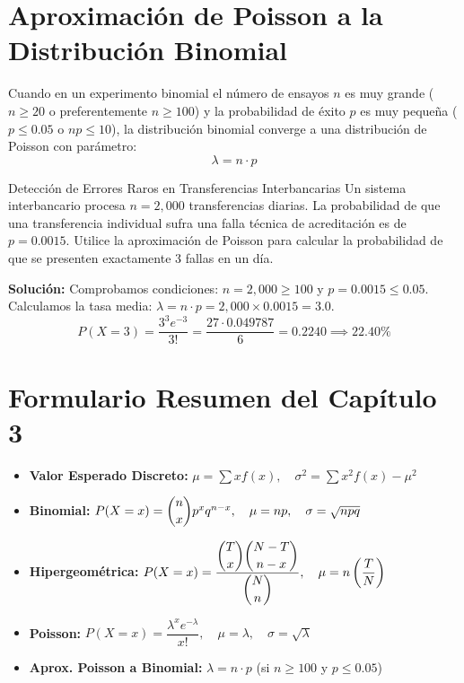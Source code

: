 \section{Aproximación de Poisson a la Distribución Binomial}
Cuando en un experimento binomial el número de ensayos $n$ es muy grande ($n \ge 20$ o preferentemente $n \ge 100$) y la probabilidad de éxito $p$ es muy pequeña ($p \le 0.05$ o $np \le 10$), la distribución binomial converge a una distribución de Poisson con parámetro:
\begin{equation}
    \lambda = n \cdot p
\end{equation}

\begin{ejemplo}{Detección de Errores Raros en Transferencias Interbancarias}
Un sistema interbancario procesa $n = 2{,}000$ transferencias diarias. La probabilidad de que una transferencia individual sufra una falla técnica de acreditación es de $p = 0.0015$. Utilice la aproximación de Poisson para calcular la probabilidad de que se presenten exactamente 3 fallas en un día.

\tcbline
\textbf{Solución:}
Comprobamos condiciones: $n = 2{,}000 \ge 100$ y $p = 0.0015 \le 0.05$.
Calculamos la tasa media: $\lambda = n \cdot p = 2{,}000 \times 0.0015 = 3.0$.
\[
P(X = 3) = \frac{3^3 e^{-3}}{3!} = \frac{27 \cdot 0.049787}{6} = 0.2240 \implies 22.40\%
\]
\end{ejemplo}

\section{Formulario Resumen del Capítulo 3}
\begin{formulario}
\begin{itemize}
    \item \textbf{Valor Esperado Discreto:} $\mu = \sum x f(x), \quad \sigma^2 = \sum x^2 f(x) - \mu^2$
    \item \textbf{Binomial:} $P(X=x) = \dbinom{n}{x} p^x q^{n-x}, \quad \mu = np, \quad \sigma = \sqrt{npq}$
    \item \textbf{Hipergeométrica:} $P(X=x) = \dfrac{\dbinom{T}{x} \dbinom{N-T}{n-x}}{\dbinom{N}{n}}, \quad \mu = n\left(\dfrac{T}{N}\right)$
    \item \textbf{Poisson:} $P(X=x) = \dfrac{\lambda^x e^{-\lambda}}{x!}, \quad \mu = \lambda, \quad \sigma = \sqrt{\lambda}$
    \item \textbf{Aprox. Poisson a Binomial:} $\lambda = n \cdot p$ (si $n \ge 100$ y $p \le 0.05$)
\end{itemize}
\end{formulario}

